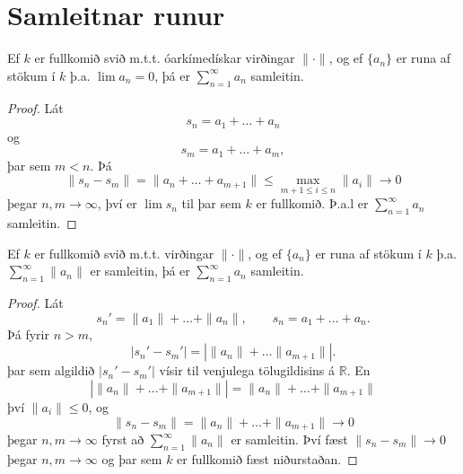 \section*{Samleitnar runur}
\begin{setn}
Ef $k$ er fullkomið svið m.t.t. óarkímedískar virðingar $\| \cdot  \|$, og ef $\{ a_n \} $ er 
runa af stökum í $k$ þ.a. $\lim a_n = 0$, þá er $\sum_{n=1}^\infty a_n$ samleitin.
\end{setn}
\begin{proof}
Lát 
\begin{equation*}
s_n = a_1+ \ldots + a_n
\end{equation*}
og
\begin{equation*}
s_m = a_1 + \ldots + a_m,
\end{equation*}
þar sem $m < n$. Þá
\begin{equation*}
\|s_n - s_m \| = \| a_n + \ldots + a_{m+1} \| \leq \max_{m+1 \leq i \leq n} \|a_i\| \rightarrow 0
\end{equation*}
þegar $n,m \rightarrow \infty$, því er $\lim s_n$ til þar sem $k$ er fullkomið. Þ.a.l er $\sum_{n=1}^\infty a_n$ samleitin.
\end{proof}

\begin{setn}
Ef $k$ er fullkomið svið m.t.t. virðingar $\| \cdot \|$, og ef $\{ a_n \}$ er runa af stökum í $k$ 
þ.a. $\sum_{n=1}^{\infty} \| a_n \| $ er samleitin, þá er $\sum_{n=1}^\infty a_n $ samleitin. 
\end{setn}
\begin{proof}
Lát 
\begin{equation*}
 s_n' = \| a_1 \| + \ldots + \|a_n\|, \qquad s_n = a_1 + \ldots + a_n.
\end{equation*}
Þá fyrir $n>m$, 
\begin{equation*}
|s_n'- s_m' | = | \| a_n \| + \ldots \|a_{m+1}\| |.
\end{equation*}
þar sem algildið $| s_n' - s_m' | $ vísir til venjulega  tölugildisins á $\mathbb{R}$. En 
\begin{equation*}
| \| a_n \| + \ldots + \| a_{m+1} \| | = \| a_n \| + \ldots + \| a_{m+1} \|
\end{equation*}
því $\| a_i \| \leq 0$, og 
\begin{equation}
\| s_n - s_m \| = \|a_n\| + \ldots + \|a_{m+1}\| \rightarrow 0
\end{equation}
þegar $n,m \rightarrow \infty$ fyrst að $\sum_{n=1}^\infty \|a_n\|$ er samleitin. 
Því fæst $\|s_n - s_m \| \rightarrow 0$ þegar $n,m \rightarrow \infty $ og þar sem $k$ er fullkomið fæst niðurstaðan.  
\end{proof}

